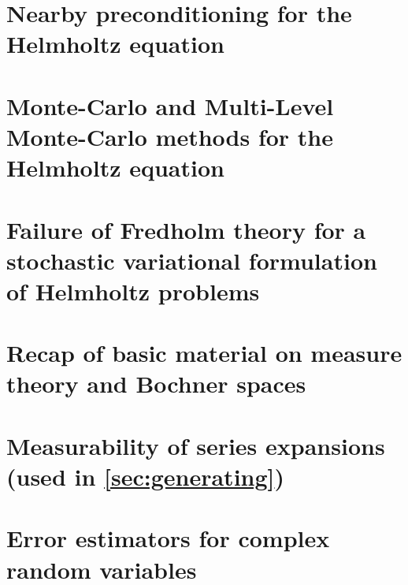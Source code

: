 \documentclass[11pt,draft]{book}
\begin{document}




\chapter[Nearby preconditioning for the Helmholtz equation]{Nearby preconditioning for the\\Helmholtz equation}\label{chap:nbpc}


\chapter[Monte-Carlo and Multi-Level Monte-Carlo methods for the Helmholtz equation]{Monte-Carlo and Multi-Level\\Monte-Carlo methods for the Helmholtz equation}\label{chap:mlmc}





\appendix

\chapter[Failure of Fredholm theory]{Failure of Fredholm theory for a sto\-chas\-tic variational formulation of Helmholtz problems}\label{sec:federico}
 	

\chapter{Recap of basic material on measure theory and Bochner spaces}\label{app:mtBs}


\chapter{Measurability of series expansions (used in \cref{sec:generating})}\label{app:meas}


\chapter{Error estimators for complex random variables}\label{app:complexerror}

\end{document}
